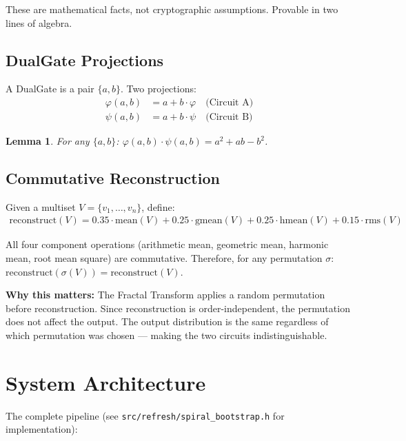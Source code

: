 \documentclass[11pt,a4paper]{article}
\newtheorem{lemma}[theorem]{Lemma}
\begin{document}
These are mathematical facts, not cryptographic assumptions. Provable in two lines of algebra.

\subsection{DualGate Projections}

A DualGate is a pair $\{a, b\}$. Two projections:
\begin{align}
\varphi(a,b) &= a + b \cdot \varphi \quad \text{(Circuit A)} \\
\psi(a,b) &= a + b \cdot \psi \quad \text{(Circuit B)}
\end{align}

\begin{lemma}
For any $\{a,b\}$: $\varphi(a,b) \cdot \psi(a,b) = a^2 + ab - b^2$.
\end{lemma}

\subsection{Commutative Reconstruction}

Given a multiset $V = \{v_1, \ldots, v_n\}$, define:
\begin{align}
\text{reconstruct}(V) = 0.35 \cdot \text{mean}(V) + 0.25 \cdot \text{gmean}(V) + 0.25 \cdot \text{hmean}(V) + 0.15 \cdot \text{rms}(V)
\end{align}

All four component operations (arithmetic mean, geometric mean, harmonic mean, root mean square) are commutative. Therefore, for any permutation $\sigma$: $\text{reconstruct}(\sigma(V)) = \text{reconstruct}(V)$.

\textbf{Why this matters:} The Fractal Transform applies a random permutation before reconstruction. Since reconstruction is order-independent, the permutation does not affect the output. The output distribution is the same regardless of which permutation was chosen --- making the two circuits indistinguishable.

\section{System Architecture}

The complete pipeline (see \texttt{src/refresh/spiral\_bootstrap.h} for implementation):
\end{document}
